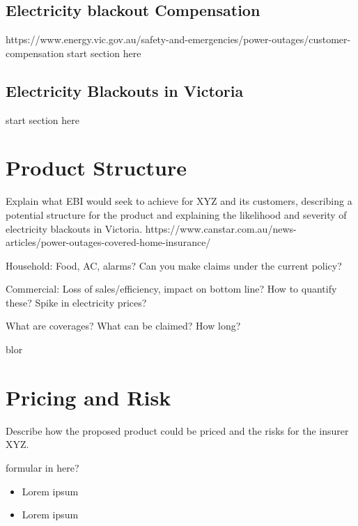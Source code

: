 \documentclass[12pt]{article}
\begin{document}
\subsection{Electricity blackout Compensation}
\begin{flushleft}
https://www.energy.vic.gov.au/safety-and-emergencies/power-outages/customer-compensation
start section here
\end{flushleft}

\subsection{Electricity Blackouts in Victoria}
\begin{flushleft}
start section here
\end{flushleft}
\newpage


\section{Product Structure}
\begin{flushleft}
Explain what EBI would seek to achieve for XYZ and its customers, describing a potential 
structure for the product and explaining the likelihood and severity of electricity blackouts in Victoria.
https://www.canstar.com.au/news-articles/power-outages-covered-home-insurance/ \par
Household: Food, AC, alarms? Can you make claims under the current policy? \par
Commercial: Loss of sales/efficiency, impact on bottom line? How to quantify these? Spike in electricity prices?\par
What are coverages? What can be claimed? How long?  
\end{flushleft}

\fullboxbegin
blor
\fullboxend


\section{Pricing and Risk}
Describe how the proposed product could be priced and the risks for the insurer XYZ. 

\leftboxbegin
formular in here?
\leftboxend

\lipsum[1]

\rightboxbegin
\begin{itemize}
 \item Lorem ipsum
 \item Lorem ipsum
\end{itemize}
\rightboxend
\end{document}
